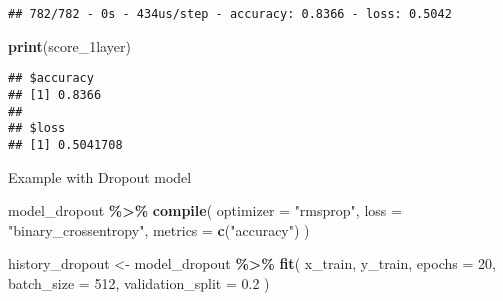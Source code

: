 \documentclass[
]{article}
\newenvironment{Shaded}{\begin{snugshade}}{\end{snugshade}}
\newcommand{\AttributeTok}[1]{\textcolor[rgb]{0.13,0.29,0.53}{#1}}
\newcommand{\DecValTok}[1]{\textcolor[rgb]{0.00,0.00,0.81}{#1}}
\newcommand{\FloatTok}[1]{\textcolor[rgb]{0.00,0.00,0.81}{#1}}
\newcommand{\FunctionTok}[1]{\textcolor[rgb]{0.13,0.29,0.53}{\textbf{#1}}}
\newcommand{\NormalTok}[1]{#1}
\newcommand{\OtherTok}[1]{\textcolor[rgb]{0.56,0.35,0.01}{#1}}
\newcommand{\SpecialCharTok}[1]{\textcolor[rgb]{0.81,0.36,0.00}{\textbf{#1}}}
\newcommand{\StringTok}[1]{\textcolor[rgb]{0.31,0.60,0.02}{#1}}
\begin{document}
\begin{verbatim}
## 782/782 - 0s - 434us/step - accuracy: 0.8366 - loss: 0.5042
\end{verbatim}

\begin{Shaded}
\begin{Highlighting}[]
\FunctionTok{print}\NormalTok{(score\_1layer)}
\end{Highlighting}
\end{Shaded}

\begin{verbatim}
## $accuracy
## [1] 0.8366
## 
## $loss
## [1] 0.5041708
\end{verbatim}

Example with Dropout model

\begin{Shaded}
\begin{Highlighting}[]
\NormalTok{model\_dropout }\SpecialCharTok{\%\textgreater{}\%} \FunctionTok{compile}\NormalTok{(}
  \AttributeTok{optimizer =} \StringTok{"rmsprop"}\NormalTok{,}
  \AttributeTok{loss =} \StringTok{"binary\_crossentropy"}\NormalTok{,}
  \AttributeTok{metrics =} \FunctionTok{c}\NormalTok{(}\StringTok{"accuracy"}\NormalTok{)}
\NormalTok{)}

\NormalTok{history\_dropout }\OtherTok{\textless{}{-}}\NormalTok{ model\_dropout }\SpecialCharTok{\%\textgreater{}\%} \FunctionTok{fit}\NormalTok{(}
\NormalTok{  x\_train, y\_train,}
  \AttributeTok{epochs =} \DecValTok{20}\NormalTok{,}
  \AttributeTok{batch\_size =} \DecValTok{512}\NormalTok{,}
  \AttributeTok{validation\_split =} \FloatTok{0.2}
\NormalTok{)}
\end{Highlighting}
\end{Shaded}
\end{document}
